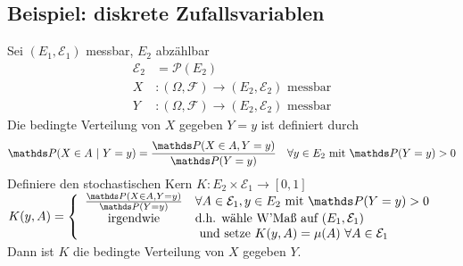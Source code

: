 \subsection{Beispiel: diskrete Zufallsvariablen}
\label{sub:bsp_dis_zv}
Sei $(E_1,\mathcal{E}_1)$ messbar, $E_2$ abzählbar
\begin{equation*}
\begin{aligned}
	\mathcal{E}_2 &= \mathcal{P}(E_2)\\
	X &: (\Omega,\mathcal{F})\to (E_2,\mathcal{E}_2) \text{ messbar}\\
	Y &: (\Omega,\mathcal{F})\to (E_2,\mathcal{E}_2)\text{ messbar}
\end{aligned}
\end{equation*}
Die bedingte Verteilung von $X$ gegeben $Y=y$ ist definiert durch 
\[
\Pw(X\in A~|~Y=y)=\frac{\Pw(X\in A,Y=y)}{\Pw(Y=y)}\quad \forall y\in E_2 \text{ mit } \Pw(Y=y)>0 
\]
Definiere den stochastischen Kern $K: E_2\times \mathcal{E}_1\to [0,1]$\\
$K(y,A)=\left\{\begin{array}{cl} 
\frac{\Pw(X\in A,Y=y)}{\Pw(Y=y)} & \forall A\in \mathcal{E}_1,y\in E_2 \text{ mit }\Pw(Y=y)>0\\
\text{irgendwie} & \text{d.h. wähle W'Maß auf } (E_1,\mathcal{E}_1)\\
& \text{ und setze } K(y,A)=\mu(A)~\forall A\in \mathcal{E}_1  \end{array}\right.$\\

Dann ist $K$ die bedingte Verteilung von $X$ gegeben $Y$.
\newpage

